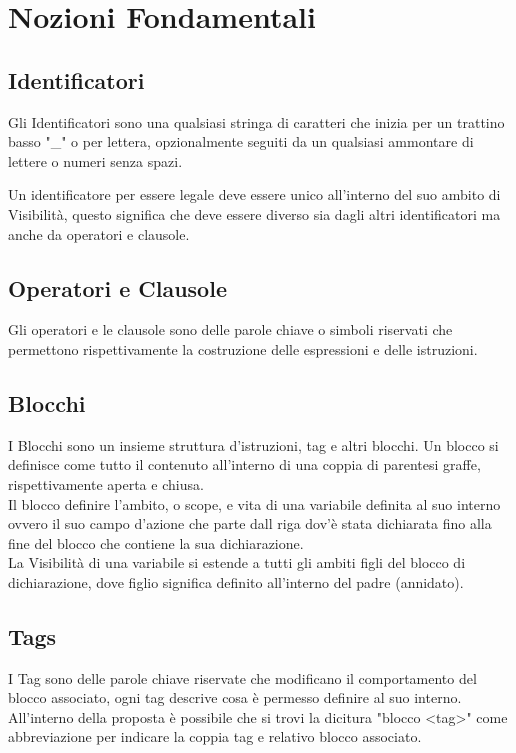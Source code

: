 \section{Nozioni Fondamentali}

\subsection{Identificatori}
Gli Identificatori sono una qualsiasi stringa di caratteri che inizia per un trattino basso "\_" o 
per lettera, opzionalmente seguiti da un qualsiasi ammontare di lettere o numeri senza spazi.

Un identificatore per essere legale deve essere unico all'interno del suo ambito di Visibilità,
questo significa che deve essere diverso sia dagli altri identificatori ma anche da operatori e clausole.  

\subsection{Operatori e Clausole}
Gli operatori e le clausole sono delle parole chiave o simboli riservati che permettono rispettivamente
la costruzione delle espressioni e delle istruzioni.

\subsection{Blocchi}
I Blocchi sono un insieme struttura d'istruzioni, tag e altri blocchi.
Un blocco si definisce come tutto il contenuto all'interno di una coppia di parentesi graffe,
rispettivamente aperta e chiusa. 
\\
Il blocco definire l'ambito, o scope, e vita di una variabile definita al suo interno ovvero
il suo campo d'azione che parte dall riga dov'è stata dichiarata fino alla fine del blocco 
che contiene la sua dichiarazione.
\\
La Visibilità di una variabile si estende a tutti gli ambiti figli del blocco di dichiarazione, 
dove figlio significa definito all'interno del padre (annidato).
 
\subsection{Tags}
I Tag sono delle parole chiave riservate che modificano il comportamento del blocco associato, 
ogni tag descrive cosa è permesso definire al suo interno.
All'interno della proposta è possibile che si trovi la dicitura "blocco <tag>" come abbreviazione
per indicare la coppia tag e relativo blocco associato.
 
